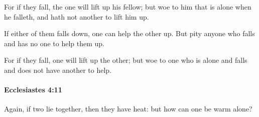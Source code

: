			\begin{versebox}
					\item[BHS] 
					\item[LXX] 
					\item[ASV] For if they fall, the one will lift up his fellow; but woe to him that is alone when he falleth, and hath not another to lift him up.
					\item[NIV] If either of them falls down, one can help the other up. But pity anyone who falls and has no one to help them up.
					\item[NRSV] For if they fall, one will lift up the other; but woe to one who is alone and falls and does not have another to help.
			\end{versebox}

		\paragraph{Ecclesiastes 4:11} %
			\label{ECCLESIASTES-4-11}

			Again, if two lie together, then they have heat: but how can one be warm alone?

